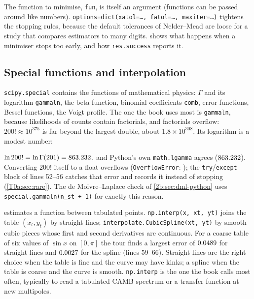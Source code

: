 
The function to minimise, \texttt{fun}, is itself an argument (functions can be passed around like numbers). \texttt{options=dict(xatol=\dots, fatol=\dots, maxiter=\dots)} tightens the stopping rules, because the default tolerances of Nelder--Mead are loose for a study that compares estimators to many digits.  shows what happens when a minimiser stops too early, and how \texttt{res.success} reports it.

\subsection{Special functions and interpolation}
\label{T0a:sec:special}

\texttt{scipy.special} contains the functions of mathematical physics: $\Gamma$ and its logarithm \texttt{gammaln}, the beta function, binomial coefficients \texttt{comb}, error functions, Bessel functions, the Voigt profile. The one the book uses most is \texttt{gammaln}, because likelihoods of counts contain factorials, and factorials overflow: $200!\approx10^{375}$ is far beyond the largest double, about $1.8\times10^{308}$. Its logarithm is a modest number:


$\ln200!=\ln\Gamma(201)=863.232$, and Python's own \texttt{math.lgamma} agrees ($863.232$). Converting $200!$ itself to a float overflows (\texttt{OverflowError}: \TzFactOverflow); the \texttt{try}/\texttt{except} block of lines 52--56 catches that error and records it instead of stopping (\cref{T0a:sec:rare}). The de Moivre--Laplace check of \cref{2b:sec:dml-python} uses \texttt{special.gammaln(n\_st + 1)} for exactly this reason.

 estimates a function between tabulated points. \texttt{np.interp(x, xt, yt)} joins the table $(x_t,y_t)$ by straight lines; \texttt{interpolate.CubicSpline(xt, yt)} by smooth cubic pieces whose first and second derivatives are continuous. For a coarse table of six values of $\sin x$ on $[0,\pi]$ the tour finds a largest error of $0.0489$ for straight lines and $0.0027$ for the spline (lines 59--66). Straight lines are the right choice when the table is fine and the curve may have kinks; a spline when the table is coarse and the curve is smooth. \texttt{np.interp} is the one the book calls most often, typically to read a tabulated CAMB spectrum or a transfer function at new multipoles.

